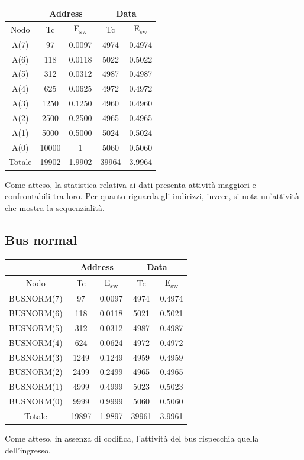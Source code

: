 \documentclass[11pt,  english, makeidx, a4paper, titlepage, oneside]{book}
\begin{document}
\begin{center}
	\begin{tabular}{|c|c|c||c|c|}
	\hline
	& \multicolumn{2}{|c||}{Address} & \multicolumn{2}{|c|}{Data}\\
	\hline
	Nodo & Tc & E\textsubscript{sw} & Tc & E\textsubscript{sw} \\
	\hline
	 A(7) & 97 & 0.0097 & 4974 & 0.4974\\
	 \hline
	A(6) & 118 & 0.0118 & 5022 & 0.5022\\
	\hline
	A(5) & 312 & 0.0312 & 4987 & 0.4987\\
	\hline
	A(4) & 625 & 0.0625 & 4972 & 0.4972\\
	\hline
	A(3) & 1250 & 0.1250 & 4960 & 0.4960\\
	\hline
	A(2) & 2500 & 0.2500 & 4965 & 0.4965\\
	\hline
	A(1) & 5000 & 0.5000 & 5024 & 0.5024\\
	\hline
	A(0) & 10000 & 1 & 5060 & 0.5060\\
	\hline
	Totale & 19902 & 1.9902 & 39964 & 3.9964\\
	\hline
	\end{tabular}	
\end{center}
\vspace{0.3cm}
Come atteso, la statistica relativa ai dati presenta attività maggiori e confrontabili tra loro. Per quanto riguarda gli indirizzi, invece, si nota un'attività che mostra la sequenzialità.
\subsection{Bus normal}
\begin{center}
	\begin{tabular}{|c|c|c||c|c|}
	\hline
	& \multicolumn{2}{|c||}{Address} & \multicolumn{2}{|c|}{Data}\\
	\hline
	Nodo & Tc & E\textsubscript{sw} & Tc & E\textsubscript{sw} \\
	\hline
	 BUSNORM(7) & 97 & 0.0097 & 4974 & 0.4974\\
	 \hline
	BUSNORM(6) & 118 & 0.0118 & 5021 & 0.5021\\
	\hline
	BUSNORM(5) & 312 & 0.0312 & 4987 & 0.4987\\
	\hline
	BUSNORM(4) & 624 & 0.0624 & 4972 & 0.4972\\
	\hline
	BUSNORM(3) & 1249 & 0.1249 & 4959 & 0.4959\\
	\hline
	BUSNORM(2) & 2499 & 0.2499 & 4965 & 0.4965\\
	\hline
	BUSNORM(1) & 4999 & 0.4999 & 5023 & 0.5023\\
	\hline
	BUSNORM(0) & 9999 & 0.9999 & 5060 & 0.5060\\
	\hline
	Totale & 19897 & 1.9897 & 39961 & 3.9961\\
	\hline
	\end{tabular}	
\end{center}
\vspace{0.3cm}
Come atteso, in assenza di codifica, l'attività del bus rispecchia quella dell'ingresso.
\end{document}
